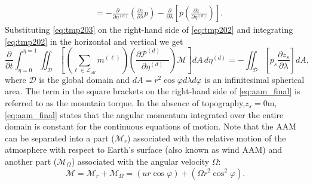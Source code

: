 \documentclass{agujournal}
\begin{document}
{\begin{align}
&=-\frac{\partial \quad}{\partial \eta^{(d)}}\left( \frac{\partial z}{\partial \lambda}p\right)-\frac{\partial }{\partial \lambda}\left[ p\left( \frac{\partial z\quad }{\partial \eta^{(d)}}\right)\right].\label{eq:tmp203}
\end{align}
Substituting \eqref{eq:tmp203} on the right-hand side of \eqref{eq:tmp202} and integrating \eqref{eq:tmp202} in the horizontal and vertical we get
\begin{equation}
\frac{\partial}{\partial t}\int_{\eta=0}^{\eta=1}\iint_{\mathcal{D}}\left[ \left( \sum_{\ell \in \mathcal{L}_{all}} m^{(\ell)}\right) \left( \frac{\partial \mathcal{P}^{(d)}\quad }{\partial \eta^{(d)}} \right) \mathcal{M} \right] dA\, d\eta^{(d)}=-\iint_{\mathcal{D}}\left[ p_s \frac{\partial z_s}{\partial \lambda}\right] dA,\label{eq:aam_final}
\end{equation}
where $\mathcal{D}$ is the global domain and $dA=r^2\cos\varphi d\lambda d\varphi$ is an infinitesimal spherical area. The term in the square brackets on the right-hand side of \eqref{eq:aam_final} is referred to as the mountain torque. In the absence of topography,$z_s=0$m, \eqref{eq:aam_final} states that the angular momentum integrated over the entire domain is constant for the continuous equations of motion. Note that the AAM can be separated into a part ($\mathcal{M}_r$) associated with the relative motion of the atmosphere with respect to Earth's surface (also known as wind AAM) and another part ($\mathcal{M}_{\Omega}$) associated with the angular velocity $\Omega$:
\begin{equation}
\mathcal{M}=\mathcal{M}_r+\mathcal{M}_\Omega=\left( u r \cos \varphi\right)+\left(\Omega r^2 \cos^2 \varphi \right) .
\end{equation}
}
\end{document}
